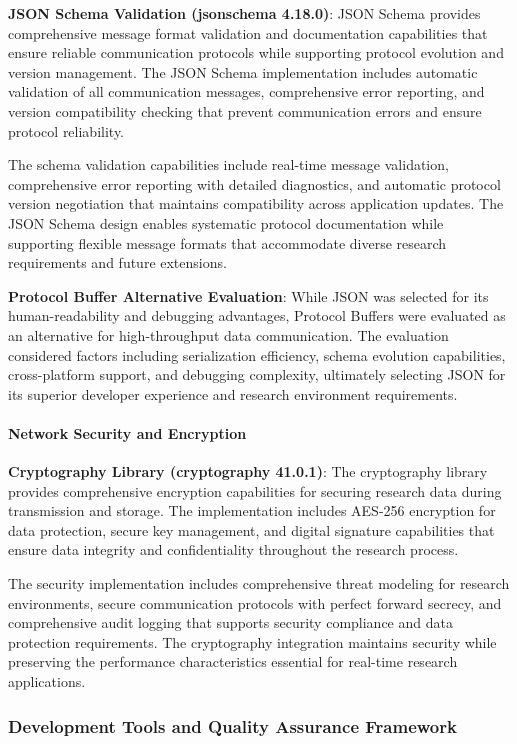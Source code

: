 \documentclass[12pt,a4paper]{report}
\begin{document}
\textbf{JSON Schema Validation (jsonschema 4.18.0)}: JSON Schema provides comprehensive message format validation and
documentation capabilities that ensure reliable communication protocols while supporting protocol evolution and version
management. The JSON Schema implementation includes automatic validation of all communication messages, comprehensive
error reporting, and version compatibility checking that prevent communication errors and ensure protocol reliability.

The schema validation capabilities include real-time message validation, comprehensive error reporting with detailed
diagnostics, and automatic protocol version negotiation that maintains compatibility across application updates. The
JSON Schema design enables systematic protocol documentation while supporting flexible message formats that accommodate
diverse research requirements and future extensions.

\textbf{Protocol Buffer Alternative Evaluation}: While JSON was selected for its human-readability and debugging advantages,
Protocol Buffers were evaluated as an alternative for high-throughput data communication. The evaluation considered
factors including serialization efficiency, schema evolution capabilities, cross-platform support, and debugging
complexity, ultimately selecting JSON for its superior developer experience and research environment requirements.

\paragraph{Network Security and Encryption}

\textbf{Cryptography Library (cryptography 41.0.1)}: The cryptography library provides comprehensive encryption capabilities
for securing research data during transmission and storage. The implementation includes AES-256 encryption for data
protection, secure key management, and digital signature capabilities that ensure data integrity and confidentiality
throughout the research process.

The security implementation includes comprehensive threat modeling for research environments, secure communication
protocols with perfect forward secrecy, and comprehensive audit logging that supports security compliance and data
protection requirements. The cryptography integration maintains security while preserving the performance
characteristics essential for real-time research applications.

\subsubsection{Development Tools and Quality Assurance Framework}
\end{document}
